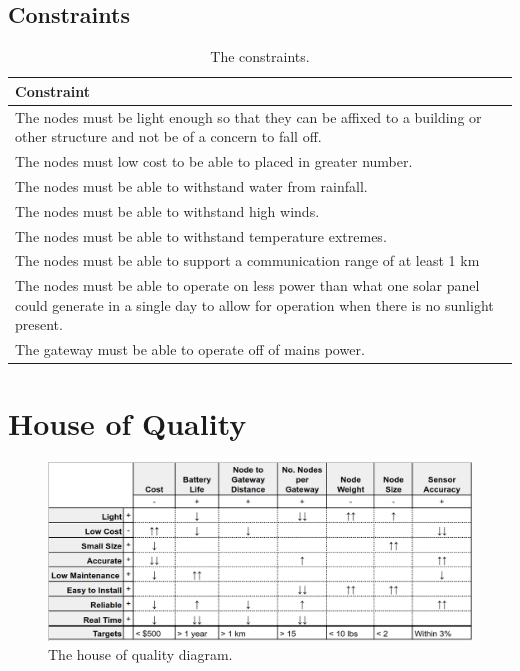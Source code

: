 \documentclass[titlepage, 11pt, letterpaper]{article}
\begin{document}
\subsection{Constraints}
\begin{table}[H]
\centering
\caption{The constraints.}
\begin{tabularx}{\linewidth}{|X|}
\hline
Constraint \\
\hline
The nodes must be light enough so that they can be affixed to a building or other structure and not be of a concern to fall off.\\\hline
The nodes must low cost to be able to placed in greater number. \\\hline
The nodes must be able to withstand water from rainfall.\\\hline
The nodes must be able to withstand high winds. \\\hline
The nodes must be able to withstand temperature extremes. \\\hline
The nodes must be able to support a communication range of at least 1 km\\\hline
The nodes must be able to operate on less power than what one solar panel could generate in a single day to allow for operation when there is no sunlight present.\\\hline
The gateway must be able to operate off of mains power.\\\hline

\end{tabularx}
\label{tab:constraints}
\end{table}

\section{House of Quality}
\begin{figure}[H]
    \centering
    \includegraphics[width=6.25in]{"./hoq.png"} 
    \caption{The house of quality diagram.}
    \label{fig:hoq}
\end{figure}
\end{document}
